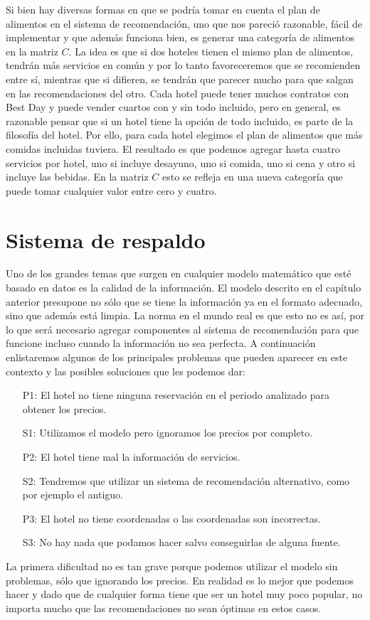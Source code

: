\documentclass[12pt]{report}
\begin{document}
Si bien hay diversas formas en que se podría tomar en cuenta el plan de alimentos en el sistema de recomendación, uno que nos pareció razonable, fácil de implementar y que además funciona bien, es generar una categoría de alimentos en la matriz $C$. La idea es que si dos hoteles tienen el mismo plan de alimentos, tendrán más servicios en común y por lo tanto favoreceremos que se recomienden entre sí, mientras que si difieren, se tendrán que parecer mucho para que salgan en las recomendaciones del otro. Cada hotel puede tener muchos contratos con Best Day y puede vender cuartos con y sin todo incluido, pero en general, es razonable pensar que si un hotel tiene la opción de todo incluido, es parte de la filosofía del hotel. Por ello, para cada hotel elegimos el plan de alimentos que más comidas incluidas tuviera. El resultado es que podemos agregar hasta cuatro servicios por hotel, uno si incluye desayuno, uno si comida, uno si cena y otro si incluye las bebidas. En la matriz $C$ esto se refleja en una nueva categoría que puede tomar cualquier valor entre cero y cuatro.

\section{Sistema de respaldo}

Uno de los grandes temas que surgen en cualquier modelo matemático que esté basado en datos es la calidad de la información. El modelo descrito en el capítulo anterior presupone no sólo que se tiene la información ya en el formato adecuado, sino que además está limpia. La norma en el mundo real es que esto no es así, por lo que será necesario agregar componentes al sistema de recomendación para que funcione incluso cuando la información no sea perfecta. A continuación enlistaremos algunos de los principales problemas que pueden aparecer en este contexto y las posibles soluciones que les podemos dar:
\begin{itemize}
	\item[P1:] El hotel no tiene ninguna reservación en el periodo analizado para obtener los precios.
	\item[S1:] Utilizamos el modelo pero ignoramos los precios por completo.
	\item[P2:] El hotel tiene mal la información de servicios.
	\item[S2:] Tendremos que utilizar un sistema de recomendación alternativo, como por ejemplo el antiguo.
	\item[P3:] El hotel no tiene coordenadas o las coordenadas son incorrectas.
	\item[S3:] No hay nada que podamos hacer salvo conseguirlas de alguna fuente.
\end{itemize}
La primera dificultad no es tan grave porque podemos utilizar el modelo sin problemas, sólo que ignorando los precios. En realidad es lo mejor que podemos hacer y dado que de cualquier forma tiene que ser un hotel muy poco popular, no importa mucho que las recomendaciones no sean óptimas en estos casos.
\end{document}
